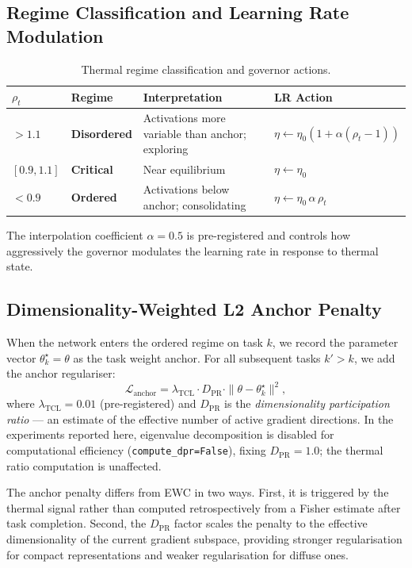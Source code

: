 \subsection{Regime Classification and Learning Rate Modulation}

\begin{table}[h]
\centering
\caption{Thermal regime classification and governor actions.}
\label{tab:regimes}
\begin{tabular}{llll}
\toprule
$\rho_t$ & Regime & Interpretation & LR Action \\
\midrule
$> 1.1$ & \textbf{Disordered} & Activations more variable than anchor; exploring &
    $\eta \leftarrow \eta_0\!\left(1 + \alpha(\rho_t - 1)\right)$ \\
$[0.9, 1.1]$ & \textbf{Critical} & Near equilibrium & $\eta \leftarrow \eta_0$ \\
$< 0.9$ & \textbf{Ordered} & Activations below anchor; consolidating &
    $\eta \leftarrow \eta_0\,\alpha\,\rho_t$ \\
\bottomrule
\end{tabular}
\end{table}

The interpolation coefficient $\alpha = 0.5$ is pre-registered and controls how
aggressively the governor modulates the learning rate in response to thermal state.

\subsection{Dimensionality-Weighted L2 Anchor Penalty}

When the network enters the ordered regime on task $k$, we record the parameter
vector $\theta^\star_k = \theta$ as the task weight anchor.
For all subsequent tasks $k' > k$, we add the anchor regulariser:
\begin{equation}
    \mathcal{L}_{\text{anchor}} = \lambda_{\text{TCL}} \cdot D_{\mathrm{PR}} \cdot
        \|\theta - \theta^\star_k\|^2,
    \label{eq:penalty}
\end{equation}
where $\lambda_{\text{TCL}} = 0.01$ (pre-registered) and $D_{\mathrm{PR}}$ is the
\emph{dimensionality participation ratio} --- an estimate of the effective number of
active gradient directions.
In the experiments reported here, eigenvalue decomposition is disabled for
computational efficiency (\texttt{compute\_dpr=False}), fixing $D_{\mathrm{PR}} = 1.0$;
the thermal ratio computation is unaffected.

The anchor penalty differs from EWC in two ways.
First, it is triggered by the thermal signal rather than computed retrospectively from
a Fisher estimate after task completion.
Second, the $D_{\mathrm{PR}}$ factor scales the penalty to the effective dimensionality
of the current gradient subspace, providing stronger regularisation for compact
representations and weaker regularisation for diffuse ones.

